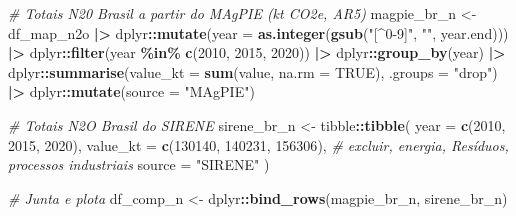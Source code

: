 \documentclass[
]{article}
\newenvironment{Shaded}{\begin{snugshade}}{\end{snugshade}}
\newcommand{\AttributeTok}[1]{\textcolor[rgb]{0.13,0.29,0.53}{#1}}
\newcommand{\CommentTok}[1]{\textcolor[rgb]{0.56,0.35,0.01}{\textit{#1}}}
\newcommand{\ConstantTok}[1]{\textcolor[rgb]{0.56,0.35,0.01}{#1}}
\newcommand{\DecValTok}[1]{\textcolor[rgb]{0.00,0.00,0.81}{#1}}
\newcommand{\FunctionTok}[1]{\textcolor[rgb]{0.13,0.29,0.53}{\textbf{#1}}}
\newcommand{\NormalTok}[1]{#1}
\newcommand{\OtherTok}[1]{\textcolor[rgb]{0.56,0.35,0.01}{#1}}
\newcommand{\SpecialCharTok}[1]{\textcolor[rgb]{0.81,0.36,0.00}{\textbf{#1}}}
\newcommand{\StringTok}[1]{\textcolor[rgb]{0.31,0.60,0.02}{#1}}
\begin{document}
\begin{Shaded}
\begin{Highlighting}[]
\CommentTok{\# Totais N20 Brasil a partir do MAgPIE (kt CO2e, AR5)}
\NormalTok{magpie\_br\_n }\OtherTok{\textless{}{-}}\NormalTok{ df\_map\_n2o }\SpecialCharTok{|\textgreater{}}
\NormalTok{  dplyr}\SpecialCharTok{::}\FunctionTok{mutate}\NormalTok{(}\AttributeTok{year =} \FunctionTok{as.integer}\NormalTok{(}\FunctionTok{gsub}\NormalTok{(}\StringTok{"[\^{}0{-}9]"}\NormalTok{, }\StringTok{""}\NormalTok{, year.end))) }\SpecialCharTok{|\textgreater{}}
\NormalTok{  dplyr}\SpecialCharTok{::}\FunctionTok{filter}\NormalTok{(year }\SpecialCharTok{\%in\%} \FunctionTok{c}\NormalTok{(}\DecValTok{2010}\NormalTok{, }\DecValTok{2015}\NormalTok{, }\DecValTok{2020}\NormalTok{)) }\SpecialCharTok{|\textgreater{}}
\NormalTok{  dplyr}\SpecialCharTok{::}\FunctionTok{group\_by}\NormalTok{(year) }\SpecialCharTok{|\textgreater{}}
\NormalTok{  dplyr}\SpecialCharTok{::}\FunctionTok{summarise}\NormalTok{(}\AttributeTok{value\_kt =} \FunctionTok{sum}\NormalTok{(value, }\AttributeTok{na.rm =} \ConstantTok{TRUE}\NormalTok{), }\AttributeTok{.groups =} \StringTok{"drop"}\NormalTok{) }\SpecialCharTok{|\textgreater{}}
\NormalTok{  dplyr}\SpecialCharTok{::}\FunctionTok{mutate}\NormalTok{(}\AttributeTok{source =} \StringTok{"MAgPIE"}\NormalTok{)}

\CommentTok{\# Totais N2O Brasil do SIRENE}
\NormalTok{sirene\_br\_n }\OtherTok{\textless{}{-}}\NormalTok{ tibble}\SpecialCharTok{::}\FunctionTok{tibble}\NormalTok{(}
  \AttributeTok{year =} \FunctionTok{c}\NormalTok{(}\DecValTok{2010}\NormalTok{, }\DecValTok{2015}\NormalTok{, }\DecValTok{2020}\NormalTok{),}
  \AttributeTok{value\_kt =} \FunctionTok{c}\NormalTok{(}\DecValTok{130140}\NormalTok{,  }\DecValTok{140231}\NormalTok{,  }\DecValTok{156306}\NormalTok{), }\CommentTok{\# excluir, energia, Resíduos, processos industriais}
  \AttributeTok{source =} \StringTok{"SIRENE"}
\NormalTok{  )}

\CommentTok{\# Junta e plota}
\NormalTok{df\_comp\_n }\OtherTok{\textless{}{-}}\NormalTok{ dplyr}\SpecialCharTok{::}\FunctionTok{bind\_rows}\NormalTok{(magpie\_br\_n, sirene\_br\_n)}


\end{Highlighting}
\end{Shaded}
\end{document}

